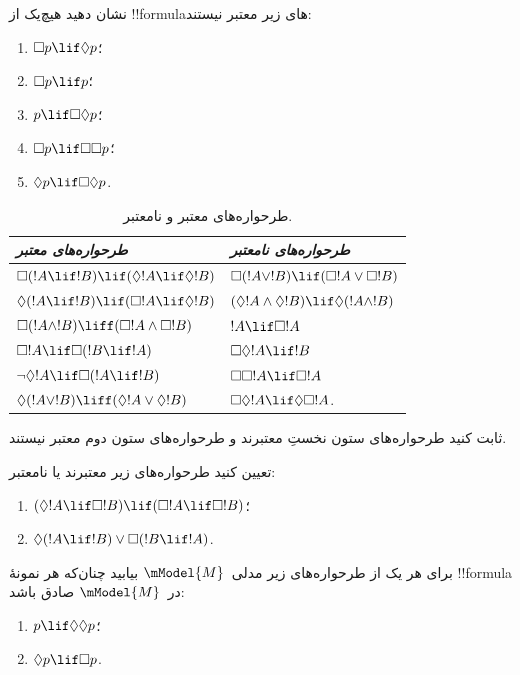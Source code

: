 \documentclass[../../../include/open-logic-section]{subfiles}
\begin{document}
\begin{prob}
  نشان دهید هیچ‌یک از !!{formula}های زیر معتبر نیستند:
  \begin{enumerate}
    \item[\Ax{D}:] \quad $\Box p \lif \Diamond p$؛
    \item[\Ax{T}:] \quad $\Box p \lif p$؛
    \item[\Ax{B}:] \quad $p \lif \Box\Diamond p$؛
    \item[\Ax{4}:] \quad $\Box p \lif \Box \Box p$؛
    \item[\Ax{5}:] \quad $\Diamond p \lif \Box \Diamond p$.
  \end{enumerate}
\end{prob}

\begin{table}[t]
    \centering
    \begin{tabular}{| l || l |}
      \hline
      {\emph{طرحواره‌های معتبر}} & {\emph{طرحواره‌های نامعتبر}} \\
      \hline\hline
      $\Box(!A \lif !B) \lif (\Diamond !A \lif \Diamond !B)$
      & $\Box (!A \lor !B) \lif (\Box !A \lor \Box !B)$ \\
      $\Diamond (!A \lif !B) \lif (\Box !A \lif \Diamond !B)$
      & $(\Diamond !A \land \Diamond !B) \lif \Diamond (!A \land !B)$\\
      $\Box (!A \land !B) \liff (\Box !A \land \Box !B)$
      & $!A \lif \Box !A$ \\
      $\Box !A \lif \Box (!B \lif !A)$
      & $\Box \Diamond !A \lif !B$ \\
      $\lnot \Diamond !A \lif \Box (!A \lif !B)$
      & $\Box \Box !A \lif \Box !A$ \\
      $\Diamond (!A \lor !B) \liff (\Diamond !A \lor \Diamond !B)$
      & $\Box \Diamond !A \lif \Diamond \Box !A$. \\
      \hline
    \end{tabular}
    \caption{طرحواره‌های معتبر و نامعتبر.}
\end{table}

\begin{prob}%
  ثابت کنید طرحواره‌های ستون نخستِ
   معتبرند و طرحواره‌های
  ستون دوم معتبر نیستند.
\end{prob}

\begin{prob}
  تعیین کنید طرحواره‌های زیر معتبرند یا نامعتبر:
  \begin{enumerate}
  \item $(\Diamond !A \lif \Box !B) \lif (\Box !A \lif \Box !B)$؛
  \item $\Diamond(!A \lif !B) \lor \Box(!B \lif !A)$.
  \end{enumerate}
\end{prob}

\begin{prob}
  برای هر یک از طرحواره‌های زیر مدلی~$\mModel{M}$ بیابید چنان‌که هر
  نمونهٔ !!{formula} در~$\mModel{M}$ صادق باشد:
  \begin{enumerate}
  \item $p \lif \Diamond\Diamond p$؛
  \item $\Diamond p \lif \Box p$.
  \end{enumerate}
\end{prob}
\end{document}
